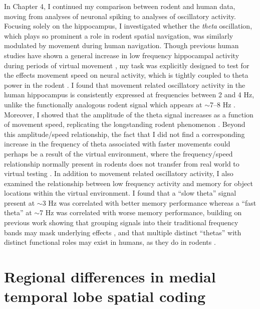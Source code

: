 In Chapter 4, I continued my comparison between rodent and human data, moving from analyses of neuronal spiking to analyses of oscillatory activity. Focusing solely on the hippocampus, I investigated whether the \textit{theta} oscillation, which plays so prominent a role in rodent spatial navigation, was similarly modulated by movement during human navigation. Though previous human studies have shown a general increase in low frequency hippocampal activity during periods of virtual movement \citep{CaplEtal03,EkstEtal05,JacoEtal10c}, my task was explicitly designed to test for the effects movement speed on neural activity, which is tightly coupled to theta power in the rodent \citep{Vand69}. I found that movement related oscillatory activity in the human hippocampus is consistently expressed at frequencies between 2 and 4 Hz, unlike the functionally analogous rodent signal which appears at $\sim$7--8 Hz \citep{Buzs02}. Moreover, I showed that the amplitude of the theta signal increases as a function of movement speed, replicating the longstanding rodent phenomenon \citep{McFaEtal75}. Beyond this amplitude/speed relationship, the fact that I did not find a corresponding increase in the frequency of theta associated with faster movements could perhaps be a result of the virtual environment, where the frequency/speed relationship normally present in rodents does not transfer from real world to virtual testing \citep{RavaEtal13}. In addition to movement related oscillatory activity, I also examined the relationship between low frequency activity and memory for object locations within the virtual environment. I found that a ``slow theta'' signal present at $\sim$3 Hz was correlated with better memory performance whereas a ``fast theta'' at $\sim$7 Hz was correlated with worse memory performance, building on previous work showing that grouping signals into their traditional frequency bands may mask underlying effects \citep{LegaEtal12}, and that multiple distinct ``thetas'' with distinct functional roles may exist in humans, as they do in rodents \citep{KramEtal75}.




\section{Regional differences in medial temporal lobe spatial coding}

